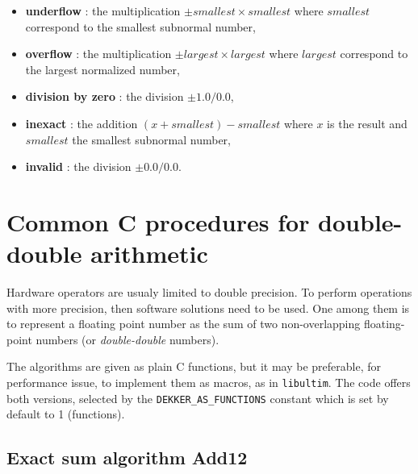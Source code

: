 \begin{itemize}
\item {\bf underflow} : the multiplication $\pm smallest \times smallest$ where $smallest$ correspond to the smallest subnormal number,
\item {\bf overflow} : the multiplication  $\pm largest \times largest$ where $largest$ correspond to the largest normalized number,
\item {\bf division by zero} : the division $\pm 1.0/0.0$,
\item {\bf inexact} : the addition $(x + smallest) - smallest$ where $x$ is the result and  $smallest$ the smallest subnormal number,
\item {\bf invalid} : the division $\pm 0.0/0.0$.
\end{itemize}








\section{Common C procedures for double-double arithmetic\label{section:commonCdoubledouble}}
Hardware operators are usualy limited to double precision. To perform
operations with more precision, then software solutions need to be
used. One among them is to represent a floating point number as the
sum of two non-overlapping floating-point numbers (or
\emph{double-double} numbers). 

The algorithms are given as plain C functions, but it may be
preferable, for performance issue, to implement them as macros, as in
\texttt{libultim}.  The code offers both versions,
selected by the \texttt{DEKKER\_AS\_FUNCTIONS} constant which is set
by default to 1 (functions).


\subsection{Exact sum algorithm {Add12}}

